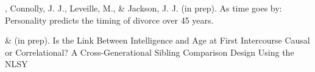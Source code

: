 \item\meb, Connolly, J. J., Leveille, M., \& Jackson, J. J. (in prep). As time goes by: Personality predicts the timing of divorce over 45 years. %
\item\meb \& \Joe (in prep). Is the Link Between Intelligence and Age at First Intercourse Causal or Correlational? A Cross-Generational Sibling Comparison Design Using the NLSY %
\vspace{-2mm}\begin{center}\end{center} \vspace{-4mm}